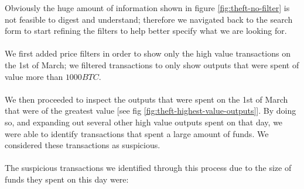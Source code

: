 Obviously the huge amount of information shown in figure \ref{fig:theft-no-filter} is not feasible to digest and understand; therefore we navigated back to the search form to start refining the filters to help better specify what we are looking for. 
\\\\
We first added price filters in order to show only the high value transactions on the 1st of March; we filtered transactions to only show outputs that were spent of value more than $1000BTC$. 
\\\\
We then proceeded to inspect the outputs that were spent on the 1st of March that were of the greatest value [see fig \ref{fig:theft-highest-value-outputs}]. By doing so, and expanding out several other high value outputs spent on that day, we were able to identify transactions that spent a large amount of funds. We considered these transactions as suspicious.
\\\\
The suspicious transactions we identified through this process due to the size of funds they spent on this day were:

